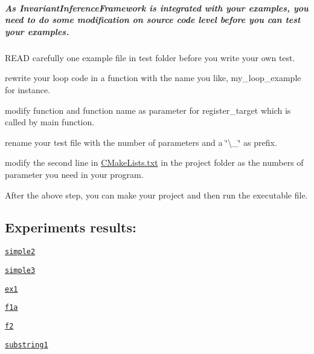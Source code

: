 \subparagraph*{As Invariant\+Inference\+Framework is integrated with your examples, you need to do some modification on source code level before you can test your examples.}


\begin{DoxyItemize}
\item R\+E\+AD carefully one example file in test folder before you write your own test.
\item rewrite your loop code in a function with the name you like, my\+\_\+loop\+\_\+example for instance.
\item modify function and function name as parameter for register\+\_\+target which is called by main function.
\item rename your test file with the number of parameters and a \char`\"{}\textbackslash{}\+\_\+\char`\"{} as prefix.
\item modify the second line in \hyperlink{CMakeLists_8txt}{C\+Make\+Lists.\+txt} in the project folder as the numbers of parameter you need in your program.
\item After the above step, you can make your project and then run the executable file.
\end{DoxyItemize}

\subsection*{Experiments results\+:}


\begin{DoxyItemize}
\item \href{./results/simple2.html}{\tt simple2}
\item \href{./results/simple3.html}{\tt simple3}
\item \href{./results/ex1.html}{\tt ex1}
\item \href{./results/f1a.html}{\tt f1a}
\item \href{./results/f2.html}{\tt f2}
\item \href{./results/substring1.html}{\tt substring1} 
\end{DoxyItemize}